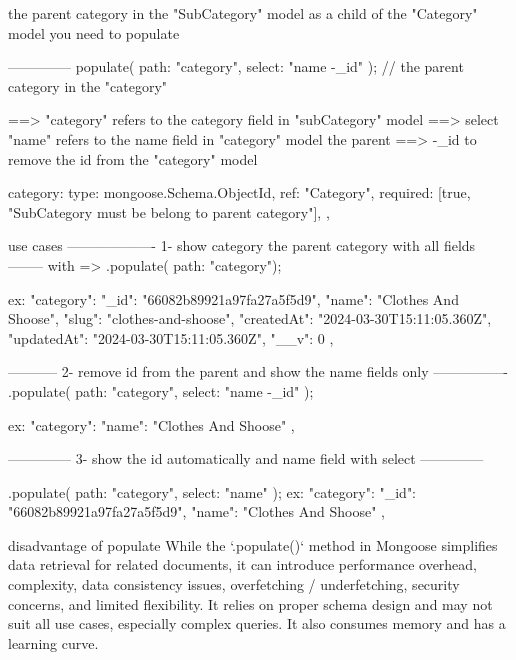               the parent category in the "SubCategory" model as a child of the "Category" model you need to populate       

              --------------
                populate({ path: "category", select: "name -_id" });   // the parent category in the "category" 

            ==> "category"  refers to the category field in "subCategory" model
            ==> select "name" refers to the name field in "category" model the parent
            ==> -_id to remove the id from the "category" model

                category: {
                        type: mongoose.Schema.ObjectId, 
                        ref: "Category", 
                        required: [true, "SubCategory must be belong to parent category"],
                    },


       use cases     ------------------- 1- show category the parent category with all fields --------
            with =>  .populate({ path: "category"});

            ex: "category": {
                                    "_id": "66082b89921a97fa27a5f5d9",
                                    "name": "Clothes And Shoose",
                                    "slug": "clothes-and-shoose",
                                    "createdAt": "2024-03-30T15:11:05.360Z",
                                    "updatedAt": "2024-03-30T15:11:05.360Z",
                                    "__v": 0
                                },

                    ----------- 2- remove id from the parent and show the name fields only ----------------
                .populate({ path: "category", select: "name -_id" });

                ex:  "category": {
                                "name": "Clothes And Shoose"
                            },

                 -------------- 3-  show the id automatically and name field with select --------------

                    .populate({ path: "category", select: "name" });
                    ex:    "category": {
                                "_id": "66082b89921a97fa27a5f5d9",
                                "name": "Clothes And Shoose"
                            },


        disadvantage of populate 
            While the `.populate()` method in Mongoose simplifies data retrieval for related documents,
              it can introduce performance overhead, complexity, data consistency issues,
              overfetching / underfetching, security concerns, and limited flexibility. 
              It relies on proper schema design and may not suit all use cases, 
              especially complex queries. It also consumes memory and has a learning curve.



